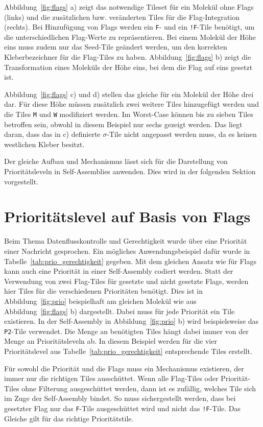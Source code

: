 Abbildung~\ref{fig:flags} a) zeigt das notwendige Tileset für ein Molekül ohne Flags (links) und die zusätzlichen bzw. veränderten Tiles für die Flag-Integration (rechts). Bei Hinzufügung von Flags werden ein \texttt{F}- und ein \texttt{!F}-Tile benötigt, um die unterschiedlichen Flag-Werte zu repräsentieren. Bei einem Molekül der Höhe eins muss zudem nur das Seed-Tile geändert werden, um den korrekten Kleberbezeichner für die Flag-Tiles zu haben. Abbildung~\ref{fig:flags} b) zeigt die Transformation eines Moleküls der Höhe eins, bei dem die Flag auf eins gesetzt ist.

Abbildung~\ref{fig:flags} c) und d) stellen das gleiche für ein Molekül der Höhe drei dar. Für diese Höhe müssen zusätzlich zwei weitere Tiles hinzugefügt werden und die Tiles \texttt{M} und \texttt{W} modifiziert werden. Im Worst-Case können bis zu sieben Tiles betroffen sein, obwohl in diesem Beispiel nur sechs gezeigt werden. Das liegt daran, dass das in c) definierte $\sigma$-Tile nicht angepasst werden muss, da es keinen westlichen Kleber besitzt.

Der gleiche Aufbau und Mechanismus lässt sich für die Darstellung von Prioritätsleveln in Self-Assemblies anwenden. Dies wird in der folgenden Sektion vorgestellt.

\section{Prioritätslevel auf Basis von Flags}

Beim Thema Datenflusskontrolle und Gerechtigkeit wurde über eine Priorität einer Nachricht gesprochen. Ein mögliches Anwendungsbeispiel dafür wurde in Tabelle~\ref{tab:prio_gerechtigkeit} gegeben. Mit dem gleichen Ansatz wie für Flags kann auch eine Priorität in einer Self-Assembly codiert werden. Statt der Verwendung von zwei Flag-Tiles für gesetzte und nicht gesetzte Flags, werden hier Tiles für die verschiedenen Prioritäten benötigt. Dies ist in Abbildung~\ref{fig:prio} beispielhaft am gleichen Molekül wie aus Abbildung~\ref{fig:flags} b) dargestellt. Dabei muss für jede Priorität ein Tile existieren. In der Self-Assembly in Abbildung~\ref{fig:prio} b) wird beispielsweise das \texttt{P2}-Tile verwendet. Die Menge an benötigten Tiles hängt dabei immer von der Menge an Prioritätsleveln ab. In diesem Beispiel werden für die vier Prioritätslevel aus Tabelle~\ref{tab:prio_gerechtigkeit} entsprechende Tiles erstellt.

Für sowohl die Priorität und die Flags muss ein Mechanismus existieren, der immer nur die richtigen Tiles ausschüttet. Wenn alle Flag-Tiles oder Priorität-Tiles ohne Filterung ausgeschüttet werden, dann ist es zufällig, welches Tile sich im Zuge der Self-Assembly bindet. So muss sichergestellt werden, dass bei gesetzter Flag nur das \texttt{F}-Tile ausgeschüttet wird und nicht das \texttt{!F}-Tile. Das Gleiche gilt für das richtige Prioritätstile.

